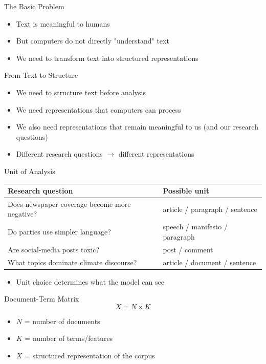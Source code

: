 \documentclass[11pt,aspectratio=43]{beamer}
\begin{document}
\begin{frame}{The Basic Problem}
\begin{itemize}
\item Text is meaningful to humans
\item But computers do not directly "understand" text
\item We need to transform text into structured representations
\end{itemize}
\end{frame}

\begin{frame}{From Text to Structure}
\begin{itemize}
\item We need to structure text before analysis
\item We need representations that computers can process
\item We also need representations that remain meaningful to us (and our research questions)
\item Different research questions $\rightarrow$ different representations
\end{itemize}
\end{frame}

\begin{frame}{Unit of Analysis}
\scriptsize
\begin{tabular}{p{}p{}}
\toprule
\textbf{Research question} & \textbf{Possible unit}\\ \midrule
Does newspaper coverage become more negative? & article / paragraph / sentence\\
Do parties use simpler language? & speech / manifesto / paragraph\\
Are social-media posts toxic? & post / comment\\
What topics dominate climate discourse? & article / document / sentence\\
\bottomrule
\end{tabular}
\vspace{1em}
\begin{itemize}\item Unit choice determines what the model can see\end{itemize}
\end{frame}

\begin{frame}{Document-Term Matrix}
\[
X=N\times K
\]
\begin{itemize}
\item $N$ = number of documents
\item $K$ = number of terms/features
\item $X$ = structured representation of the corpus
\end{itemize}
\end{frame}
\end{document}
